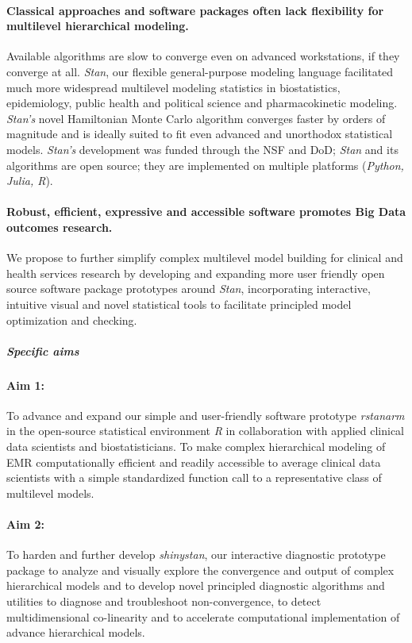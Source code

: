 \documentclass[11pt,notitlepage]{article}
\begin{document}
\paragraph*{Classical approaches and software packages often lack flexibility 
for multilevel hierarchical modeling.} Available algorithms are slow to converge 
even on advanced workstations, if they converge at all. \textit{Stan}, our 
flexible general-purpose modeling language facilitated much more widespread 
multilevel modeling statistics in biostatistics, epidemiology, public health 
and political science and pharmacokinetic modeling. \textit{Stan's} novel 
Hamiltonian Monte Carlo algorithm converges faster by orders of magnitude 
and is ideally suited to fit even advanced and unorthodox statistical 
models. \textit{Stan's} development was funded through the NSF and DoD; 
\textit{Stan} and its algorithms are open source; they are implemented on 
multiple platforms (\textit{Python, Julia, R}). 

\paragraph*{Robust, efficient, expressive and accessible software promotes Big 
Data outcomes research.} We propose to further simplify complex multilevel model 
building for clinical and health services research by developing and expanding 
more user friendly open source software package prototypes around \textit{Stan}, 
incorporating interactive, intuitive visual and novel statistical tools to 
facilitate principled model optimization and checking. 

\subparagraph{Specific aims}
\paragraph*{Aim 1:} To advance and expand our simple and user-friendly software 
prototype \textit{rstanarm} in the open-source statistical environment \textit{R} 
in collaboration with applied clinical data scientists and biostatisticians. To 
make complex hierarchical modeling of EMR computationally efficient and readily 
accessible to average clinical data scientists with a simple standardized function 
call to a representative class of multilevel models.

\paragraph*{Aim 2:} To harden and further develop \textit{shinystan}, our 
interactive diagnostic prototype package to analyze and visually explore 
the convergence and output of complex hierarchical models and to develop novel 
principled diagnostic algorithms and utilities to diagnose and troubleshoot 
non-convergence, to detect multidimensional co-linearity and to accelerate 
computational implementation of advance hierarchical models.
\end{document}
